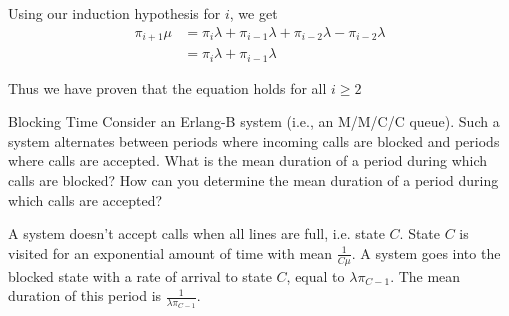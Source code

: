 \begin{solution}
  Using our induction hypothesis for $i$, we get
  \begin{align*}
    \pi_{i+1}\mu  &= \pi_i\lambda + \pi_{i-1}\lambda + \pi_{i-2}\lambda - \pi_{i-2}\lambda \\
    &= \pi_i\lambda + \pi_{i-1}\lambda
  \end{align*}

  Thus we have proven that the equation holds for all $i \geq 2$
\end{solution}

\begin{problem}{Blocking Time}
Consider an Erlang-B system (i.e., an M/M/C/C queue). Such a system alternates between periods where incoming calls are blocked and periods where calls are accepted. What is the mean duration of a period during which calls are blocked? How can you determine the mean duration of a period during which calls are accepted?
\end{problem}

\begin{solution}
  A system doesn't accept calls when all lines are full, i.e. state $C$. State $C$ is visited for an exponential amount of time with mean $\frac{1}{C\mu}$. A system goes into the blocked state with a rate of arrival to state $C$, equal to $\lambda\pi_{C-1}$. The mean duration of this period is $\frac{1}{\lambda\pi_{C-1}}$.
\end{solution}
